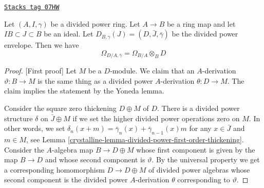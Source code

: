 \begin{lemma}
\label{crystalline-lemma-module-differentials-divided-power-envelope}
\href{https://stacks.math.columbia.edu/tag/07HW}{\texttt{Stacks tag 07HW}}

Let $(A, I, \gamma)$ be a divided power ring. Let $A \to B$ be a ring
map and let $IB \subset J \subset B$ be an ideal. Let
$D_{B, \gamma}(J) = (D, \bar J, \bar \gamma)$ be the divided power envelope.
Then we have
$$
\Omega_{D/A, \bar\gamma} = \Omega_{B/A} \otimes_B D
$$
\end{lemma}

\begin{proof}
[First proof]
Let $M$ be a $D$-module. We claim that an $A$-derivation
$\vartheta : B \to M$ is the same thing as a divided power
$A$-derivation $\theta : D \to M$. The claim implies the
statement by the Yoneda lemma.

\medskip\noindent
Consider the square zero thickening $D \oplus M$ of $D$.
There is a divided power structure $\delta$ on $\bar J \oplus M$
if we set the higher divided power operations zero on $M$.
In other words, we set
$\delta_n(x + m) = \bar\gamma_n(x) + \bar\gamma_{n - 1}(x)m$ for
any $x \in \bar J$ and $m \in M$, see
Lemma \ref{crystalline-lemma-divided-power-first-order-thickening}.
Consider the $A$-algebra map $B \to D \oplus M$ whose first
component is given by the map $B \to D$ and whose second component
is $\vartheta$. By the universal property we get a corresponding
homomorphism $D \to D \oplus M$ of divided power algebras
whose second component is the divided power
$A$-derivation $\theta$ corresponding to $\vartheta$.
\end{proof}

